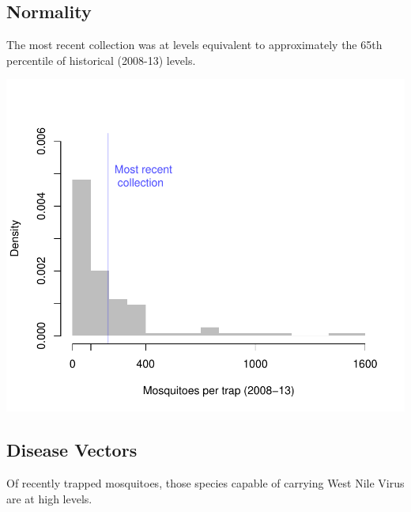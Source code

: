 \documentclass{article}
\begin{document}
\begin{multicols}{2} 


\vfill
\columnbreak
\subsection*{Normality}
The most recent collection was at levels equivalent to approximately the 65th percentile of historical (2008-13) levels.

\includegraphics{mosquitoReport-004}

\vfill
\columnbreak



\subsection*{Disease Vectors}

Of recently trapped mosquitoes, those species capable of carrying West Nile Virus are at high levels.


\end{multicols}
\end{document}
